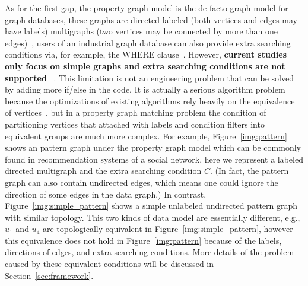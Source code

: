As for the first gap, the property graph model is the de facto graph model for graph databases,
these graphs are directed labeled (both vertices and edges may have labels)
multigraphs (two vertices may be connected by more than one edges)~\cite{DBLP:journals/pvldb/SahuMSLO17},
users of an industrial graph database can also provide extra searching conditions via,
for example, the WHERE clause~\cite{DBLP:journals/csur/AnglesABHRV17}.
However, \textbf{current studies only focus on simple graphs and extra searching conditions are not supported}
~\cite{DBLP:journals/pvldb/SunWWSL12,DBLP:conf/sigmod/HanLL13,DBLP:conf/sigmod/KimLBHLKJ16,DBLP:journals/pvldb/QiaoZC17,DBLP:journals/pvldb/MhedhbiS19}.
This limitation is not an engineering problem that can be solved by adding more if/else in the code.
It is actually a serious algorithm problem because the optimizations of existing algorithms rely heavily on the equivalence of vertices~\cite{DBLP:conf/sigmod/HanLL13,DBLP:journals/pvldb/QiaoZC17},
but in a property graph matching problem the condition of partitioning vertices that attached with labels and condition filters into equivalent groups are much more complex.
For example, Figure~\ref{img:pattern} shows an pattern graph under the property graph model which can be commonly found in recommendation systems of a social network,
here we represent a labeled directed multigraph and the extra searching condition $C$.
(In fact, the pattern graph can also contain undirected edges,
which means one could ignore the direction of some edges in the data graph.)
In contrast, Figure~\ref{img:simple_pattern} shows a simple unlabeled undirected pattern graph with similar topology.
This two kinds of data model are essentially different,
e.g., $u_1$ and $u_4$ are topologically equivalent in Figure~\ref{img:simple_pattern},
however this equivalence does not hold in Figure~\ref{img:pattern} because of the labels, directions of edges, and extra searching conditions.
More details of the problem caused by these equivalent conditions will be discussed in Section~\ref{sec:framework}.
